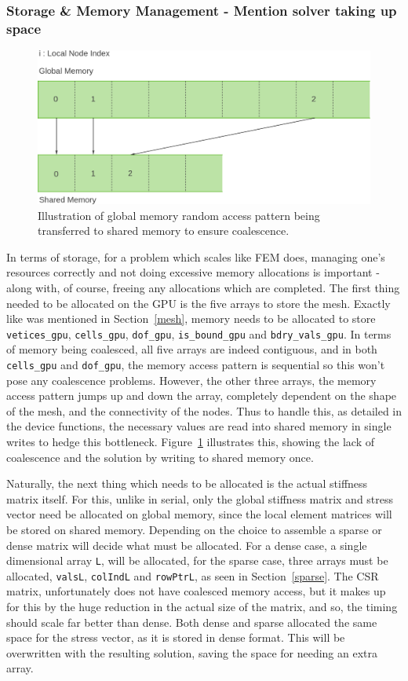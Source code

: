 \subsubsection{Storage \& Memory Management - Mention solver taking up space}

\begin{figure}
	\centering
	\includegraphics[width = 0.8\linewidth]{Figures/non_coalesced}
	\caption{Illustration of global memory random access pattern being transferred to shared memory to ensure coalescence.}
	\label{fig:coalesc}
\end{figure}
In terms of storage, for a problem which scales like FEM does, managing one's resources correctly and not doing excessive memory allocations is important - along with, of course, freeing any allocations which are completed. The first thing needed to be allocated on the GPU is the five arrays to store the mesh. Exactly like was mentioned in Section~\ref{mesh}, memory needs to be allocated to store \texttt{vetices\_gpu}, \texttt{cells\_gpu}, \texttt{dof\_gpu}, \texttt{is\_bound\_gpu} and \texttt{bdry\_vals\_gpu}. In terms of memory being coalesced, all five arrays are indeed contiguous, and in both \texttt{cells\_gpu} and \texttt{dof\_gpu}, the memory access pattern is sequential so this won't pose any coalescence problems. However, the other three arrays, the memory access pattern jumps up and down the array, completely dependent on the shape of the mesh, and the connectivity of the nodes. Thus to handle this, as detailed in the device functions, the necessary values are read into shared memory in single writes to hedge this bottleneck. Figure~\ref{fig:coalesc} illustrates this, showing the lack of coalescence and the solution by writing to shared memory once.

Naturally, the next thing which needs to be allocated is the actual stiffness matrix itself. For this, unlike in serial, only the global stiffness matrix and stress vector need be allocated on global memory, since the local element matrices will be stored on shared memory. Depending on the choice to assemble a sparse or dense matrix will decide what must be allocated. For a dense case, a single dimensional array \texttt{L}, will be allocated, for the sparse case, three arrays must be allocated, \texttt{valsL}, \texttt{colIndL} and \texttt{rowPtrL}, as seen in Section~\ref{sparse}. The CSR matrix, unfortunately does not have coalesced memory access, but it makes up for this by the huge reduction in the actual size of the matrix, and so, the timing should scale far better than dense. Both dense and sparse allocated the same space for the stress vector, as it is stored in dense format. This will be overwritten with the resulting solution, saving the space for needing an extra array.

